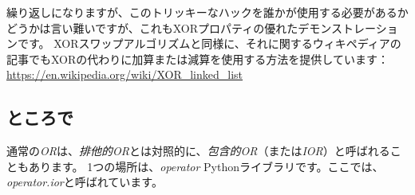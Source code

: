 繰り返しになりますが、このトリッキーなハックを誰かが使用する必要があるかどうかは言い難いですが、これもXORプロパティの優れたデモンストレーションです。
XORスワップアルゴリズムと同様に、それに関するウィキペディアの記事でもXORの代わりに加算または減算を使用する方法を提供しています：
\url{https://en.wikipedia.org/wiki/XOR_linked_list}




\subsection{ところで}

通常の\emph{OR}は、\emph{排他的OR}とは対照的に、\emph{包含的OR}（または\emph{IOR}）と呼ばれることもあります。 
1つの場所は、\emph{operator} Pythonライブラリです。ここでは、\emph{operator.ior}と呼ばれています。

